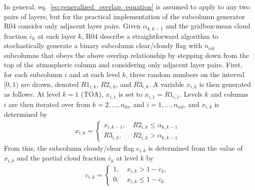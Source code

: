 In general, eq.~\ref{eq:generalized_overlap_equation} is assumed to
apply to any two pairs of layers, but for the practical implementation
of the subcolumn generator R04 consider only adjacent layer pairs. Given
\(\alpha_{k, k-1}\) and the gridbox-mean cloud fraction
\(\overline{c}_{k}\) at each layer \(k\), R04 describe a straightforward
algorithm to stochastically generate a binary subcolumn clear/cloudy
flag with \(n_\textrm{col}\) subcolumns that obeys the above overlap
relationship by stepping down from the top of the atmospheric column and
considering only adjacent layer pairs. First, for each subcolumn \(i\)
and at each level \(k\), three random numbers on the interval \([0, 1)\)
are drawn, denoted \(R1_{i, k}\), \(R2_{i, k}\), and \(R3_{i, k}\). A
variable \(x_{i, k}\) is then generated as follows. At level \(k = 1\)
(TOA), \(x_{i, 1}\) is set to \(x_{i, 1} = R1_{i, 1}\). Levels \(k\) and
columns \(i\) are then iterated over from
\(k = 2, \ldots, n_\textrm{lev}\) and \(i = 1, \ldots, n_\textrm{col}\),
and \(x_{i, k}\) is determined by
\[\begin{gathered} x_{i, k} = \begin{cases} x_{i, k-1}, ~ & R2_{i,
k} \le \alpha_{k, k-1} \\ R3_{i, k}, ~ & R2_{i, k} > \alpha_{k, k-1}
\end{cases}\end{gathered}\] From this, the subcolumn cloudy/clear flag
\(c_{i, k}\) is determined from the value of \(x_{i, k}\) and the
partial cloud fraction \(\overline{c}_{k}\) at level \(k\) by
\[\begin{gathered} c_{i, k} = \begin{cases}
1, ~ & x_{i, k} > 1 - \overline{c}_{k}, \\ 0, ~ & x_{i, k} \le 1 -
\overline{c}_{k} \end{cases}\end{gathered}\]

